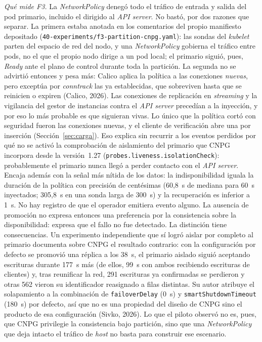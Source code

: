 \documentclass[12pt,twocolumn,letterpaper]{article}
\begin{document}
\textit{Qué mide F3.} La \textit{NetworkPolicy} denegó todo el tráfico de entrada y salida del pod primario, incluido el dirigido al \textit{API server}. No bastó, por dos razones que separar. La primera estaba anotada en los comentarios del propio manifiesto depositado (\texttt{40-experiments/\allowbreak f3-partition-\allowbreak cnpg.yaml}): las sondas del \textit{kubelet} parten del espacio de red del nodo, y una \textit{NetworkPolicy} gobierna el tráfico entre pods, no el que el propio nodo dirige a un pod local; el primario siguió, pues, \textit{Ready} ante el plano de control durante toda la partición. La segunda no se advirtió entonces y pesa más: Calico aplica la política a las conexiones \emph{nuevas}, pero exceptúa por \textit{conntrack} las ya establecidas, que sobreviven hasta que se reinicien o expiren  (Calico, 2026). Las conexiones de replicación en \textit{streaming} y la vigilancia del gestor de instancias contra el \textit{API server} precedían a la inyección, y por eso lo más probable es que siguieran vivas. Lo único que la política cortó con seguridad fueron las conexiones nuevas, y el cliente de verificación abre una por inserción (Sección~\ref{sec:carga}). Eso explica sin recurrir a los eventos perdidos por qué no se activó la comprobación de aislamiento del primario que CNPG incorpora desde la versión~1.27 (\texttt{probes.liveness.\allowbreak isolationCheck}): probablemente el primario nunca llegó a perder contacto con el \textit{API server}. Encaja además con la señal más nítida de los datos: la indisponibilidad iguala la duración de la política con precisión de centésimas  (60,8~s de mediana para 60~s inyectados; 305,8~s en una sonda larga de 300~s) y la recuperación es inferior a 1~s. No hay registro de que el operador emitiera evento alguno. La ausencia de promoción no expresa entonces una preferencia por la consistencia sobre la disponibilidad: expresa que el fallo no fue detectado. La distinción tiene consecuencias. Un experimento independiente que sí logró aislar por completo al primario documenta sobre CNPG el resultado contrario: con la configuración por defecto se promovió una réplica a los 38~s, el primario aislado siguió aceptando escrituras durante 177~s más  (de ellos, 99~s con ambos recibiendo escrituras de clientes) y, tras reunificar la red, 291 escrituras ya confirmadas se perdieron y otras 562 vieron su identificador reasignado a filas distintas. Su autor atribuye el solapamiento a la combinación de \texttt{failoverDelay} (0~s) y \texttt{smartShutdownTimeout} (180~s) por defecto, así que no es una propiedad del diseño de CNPG sino el producto de esa configuración (Sivko, 2026). Lo que el piloto observó no es, pues, que CNPG privilegie la consistencia bajo partición, sino que una \textit{NetworkPolicy} que deja intacto el tráfico de \textit{host} no basta para construir ese escenario.
\end{document}
